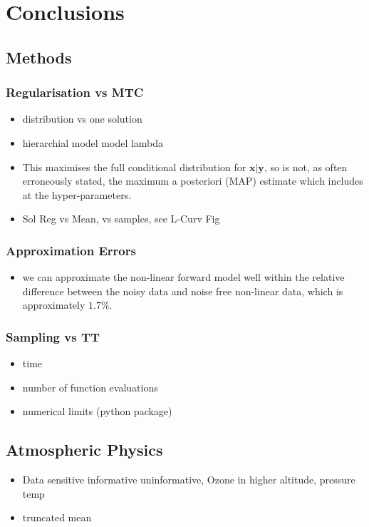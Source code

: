 \chapter{Conclusions}
\label{ch:Concl}

\section{Methods}

\subsection{Regularisation vs MTC}
\begin{itemize}
	\item distribution vs one solution
	\item hierarchial model model lambda
	\item This maximises the full conditional distribution for $\bm{x}|\bm{y}$, so is not, as often erroneously stated, the maximum a posteriori (MAP) estimate which includes at the hyper-parameters.
	\item Sol Reg vs Mean, vs samples, see L-Curv Fig
\end{itemize}

\subsection{Approximation Errors}
\begin{itemize}
	\item  we can approximate the non-linear forward model well within the relative difference between the noisy data and noise free non-linear data, which is approximately $ 1.7 \%$.
\end{itemize}

\subsection{Sampling vs TT}
\begin{itemize}
	\item time
	\item number of function evaluations
	\item numerical limits (python package)
\end{itemize}

\section{Atmospheric Physics}
\begin{itemize}
	\item Data sensitive informative uninformative, Ozone in higher altitude, pressure  temp
	\item truncated mean
\end{itemize}


